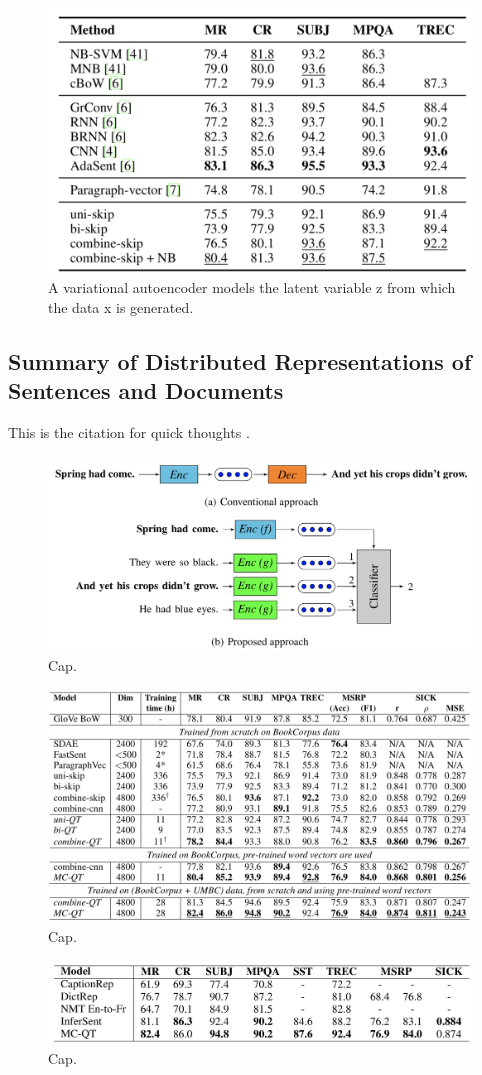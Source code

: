 \begin{figure}
\centering
  \includegraphics[width=.5\linewidth]{files/skipthoughts-8.png}
  \caption{A variational autoencoder models the latent variable z from which the data x is generated.}
  \label{fig:vae}
\end{figure}

\subsection{Summary of Distributed Representations of Sentences and Documents}

This is the citation for quick thoughts \cite{logeswaran2018an}.

\begin{figure}
\centering
  \includegraphics[width=.5\linewidth]{files/quickthoughts-1.png}
  \caption{Cap.}
  \label{fig:vae}
\end{figure}

\begin{figure}
\centering
  \includegraphics[width=.5\linewidth]{files/quickthoughts-2.png}
  \caption{Cap.}
  \label{fig:vae}
\end{figure}

\begin{figure}
\centering
  \includegraphics[width=.5\linewidth]{files/quickthoughts-3.png}
  \caption{Cap.}
  \label{fig:vae}
\end{figure}

